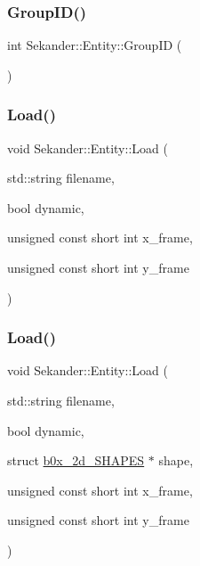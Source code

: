 \subsubsection{\texorpdfstring{Group\+I\+D()}{GroupID()}}
{\footnotesize\ttfamily int Sekander\+::\+Entity\+::\+Group\+ID (\begin{DoxyParamCaption}{ }\end{DoxyParamCaption})\hspace{0.3cm}{\ttfamily [inline]}}

\mbox{\label{classSekander_1_1Entity_a80ce51e0d09a5ac63eb3c385c47f5d73}} 
\subsubsection{\texorpdfstring{Load()}{Load()}\hspace{0.1cm}{\footnotesize\ttfamily [1/2]}}
{\footnotesize\ttfamily void Sekander\+::\+Entity\+::\+Load (\begin{DoxyParamCaption}\item[{std\+::string}]{filename,  }\item[{bool}]{dynamic,  }\item[{unsigned const short int}]{x\+\_\+frame,  }\item[{unsigned const short int}]{y\+\_\+frame }\end{DoxyParamCaption})}

\mbox{\label{classSekander_1_1Entity_a3381ab7a718fbb980415910f47970468}} 
\subsubsection{\texorpdfstring{Load()}{Load()}\hspace{0.1cm}{\footnotesize\ttfamily [2/2]}}
{\footnotesize\ttfamily void Sekander\+::\+Entity\+::\+Load (\begin{DoxyParamCaption}\item[{std\+::string}]{filename,  }\item[{bool}]{dynamic,  }\item[{struct \hyperlink{structSekander_1_1b0x__2d__SHAPES}{b0x\+\_\+2d\+\_\+\+S\+H\+A\+P\+ES} $\ast$}]{shape,  }\item[{unsigned const short int}]{x\+\_\+frame,  }\item[{unsigned const short int}]{y\+\_\+frame }\end{DoxyParamCaption})}

